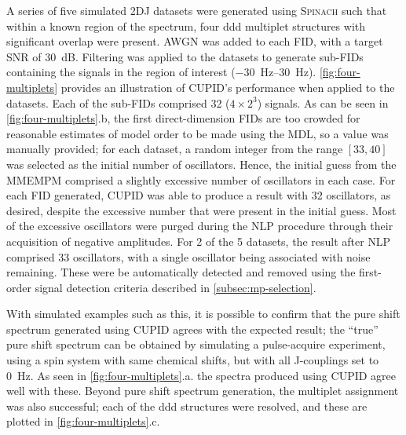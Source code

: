 A series of five simulated \ac{2DJ} datasets
were generated using \textsc{Spinach} such that within a
known region of the spectrum, four ddd multiplet
structures with significant overlap were present. \ac{AWGN} was added to each
\ac{FID}, with a target \ac{SNR} of \qty{30}{\deci\bel}.
Filtering was applied to the datasets to generate sub-\acp{FID} containing the
signals in the region of interest
(\SIrange{-30}{30}{\hertz}).
\cref{fig:four-multiplets} provides an illustration of \ac{CUPID}'s performance
when applied to the datasets.
Each of the sub-\acp{FID} comprised 32 ($4 \times 2^3$) signals.
As can be seen in \cref{fig:four-multiplets}.b, the first direct-dimension
\acp{FID} are too crowded for reasonable estimates of model
order to be made using the \ac{MDL}, so a value was manually provided; for each
dataset, a random
integer from the range $[33, 40]$ was selected as the initial number of
oscillators. Hence, the initial guess from the \ac{MMEMPM} comprised a
slightly excessive number of oscillators in each case.
For each \ac{FID} generated, \ac{CUPID} was able to produce a
result with 32 oscillators, as desired, despite the excessive number
that were present in the initial guess. Most of the excessive oscillators were
purged during the \ac{NLP} procedure through their acquisition of negative
amplitudes.
For 2 of the 5 datasets, the result after \ac{NLP} comprised 33
oscillators, with a single oscillator being associated with noise remaining.
These were be automatically detected and removed using the first-order signal
detection criteria described in \cref{subsec:mp-selection}.

With simulated examples such as this, it is possible to confirm that the pure
shift spectrum generated using \ac{CUPID} agrees with the expected result; the
``true'' pure shift spectrum can be obtained by simulating a pulse-acquire
experiment, using a spin system with same chemical shifts, but with all J-couplings
set to \qty{0}{\hertz}. As seen in \cref{fig:four-multiplets}.a. the spectra
produced using \ac{CUPID} agree well with these. Beyond pure shift spectrum
generation, the multiplet assignment was also successful; each of the ddd
structures were resolved, and these are plotted in
\cref{fig:four-multiplets}.c.

